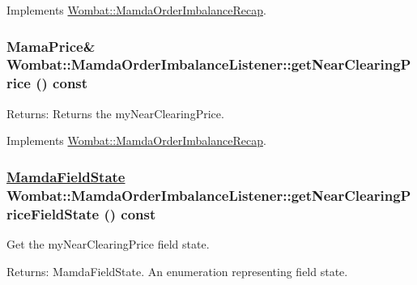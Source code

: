 Implements \hyperlink{classWombat_1_1MamdaOrderImbalanceRecap_dce3165730870835e74d2fb704965cad}{Wombat::Mamda\-Order\-Imbalance\-Recap}.\hypertarget{classWombat_1_1MamdaOrderImbalanceListener_179bd16864d6c3bc9bf7758759f2e336}{
\subsubsection[getNearClearingPrice]{\setlength{\rightskip}{0pt plus 5cm}Mama\-Price\& Wombat::Mamda\-Order\-Imbalance\-Listener::get\-Near\-Clearing\-Price () const}}
\label{classWombat_1_1MamdaOrderImbalanceListener_179bd16864d6c3bc9bf7758759f2e336}


\begin{Desc}
\item[Returns:]Returns the my\-Near\-Clearing\-Price. \end{Desc}


Implements \hyperlink{classWombat_1_1MamdaOrderImbalanceRecap_b9c9fff21f52344038f8b2aca1a5e672}{Wombat::Mamda\-Order\-Imbalance\-Recap}.\hypertarget{classWombat_1_1MamdaOrderImbalanceListener_f7935fdf67c67ffefadc39456a39448d}{
\subsubsection[getNearClearingPriceFieldState]{\setlength{\rightskip}{0pt plus 5cm}\hyperlink{namespaceWombat_93aac974f2ab713554fd12a1fa3b7d2a}{Mamda\-Field\-State} Wombat::Mamda\-Order\-Imbalance\-Listener::get\-Near\-Clearing\-Price\-Field\-State () const}}
\label{classWombat_1_1MamdaOrderImbalanceListener_f7935fdf67c67ffefadc39456a39448d}


Get the my\-Near\-Clearing\-Price field state. 

\begin{Desc}
\item[Returns:]Mamda\-Field\-State. An enumeration representing field state. \end{Desc}


